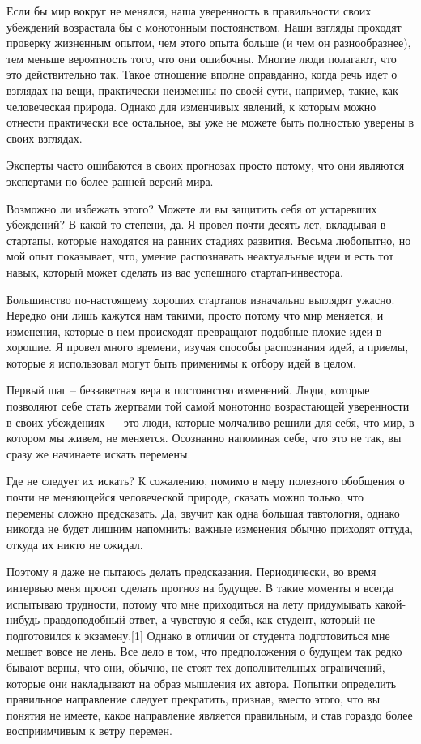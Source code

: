 \documentclass[ebook,12pt,oneside,openany]{memoir}
\begin{document}
\maketitle

Если бы мир вокруг не менялся, наша уверенность в правильности своих
убеждений возрастала бы с монотонным постоянством. Наши взгляды
проходят проверку жизненным опытом, чем этого опыта больше (и чем он
разнообразнее), тем меньше вероятность того, что они ошибочны. Многие
люди полагают, что это действительно так. Такое отношение вполне
оправданно, когда речь идет о взглядах на вещи, практически неизменны
по своей сути, например, такие, как человеческая природа. Однако для
изменчивых явлений, к которым можно отнести практически все остальное,
вы уже не можете быть полностью уверены в своих взглядах.

Эксперты часто ошибаются в своих прогнозах просто потому, что они
являются экспертами по более ранней версий мира.

Возможно ли избежать этого? Можете ли вы защитить себя от устаревших
убеждений? В какой-то степени, да. Я провел почти десять лет,
вкладывая в стартапы, которые находятся на ранних стадиях развития.
Весьма любопытно, но мой опыт показывает, что, умение распознавать
неактуальные идеи и есть тот навык, который может сделать из вас
успешного стартап-инвестора.

Большинство по-настоящему хороших стартапов изначально выглядят
ужасно. Нередко они лишь кажутся нам такими, просто потому что мир
меняется, и изменения, которые в нем происходят превращают подобные
плохие идеи в хорошие. Я провел много времени, изучая способы
распознания идей, а приемы, которые я использовал могут быть применимы
к отбору идей в целом.

Первый шаг – беззаветная вера в постоянство изменений. Люди, которые
позволяют себе стать жертвами той самой монотонно возрастающей
уверенности в своих убеждениях — это люди, которые молчаливо решили
для себя, что мир, в котором мы живем, не меняется. Осознанно
напоминая себе, что это не так, вы сразу же начинаете искать перемены.

Где не следует их искать? К сожалению, помимо в меру полезного
обобщения о почти не меняющейся человеческой природе, сказать можно
только, что перемены сложно предсказать. Да, звучит как одна большая
тавтология, однако никогда не будет лишним напомнить: важные изменения
обычно приходят оттуда, откуда их никто не ожидал.

Поэтому я даже не пытаюсь делать предсказания. Периодически, во время
интервью меня просят сделать прогноз на будущее. В такие моменты я
всегда испытываю трудности, потому что мне приходиться на лету
придумывать какой-нибудь правдоподобный ответ, а чувствую я себя, как
студент, который не подготовился к экзамену.[1] Однако в отличии от
студента подготовиться мне мешает вовсе не лень. Все дело в том, что
предположения о будущем так редко бывают верны, что они, обычно, не
стоят тех дополнительных ограничений, которые они накладывают на образ
мышления их автора. Попытки определить правильное направление следует
прекратить, признав, вместо этого, что вы понятия не имеете, какое
направление является правильным, и став гораздо более восприимчивым к
ветру перемен.
\end{document}
